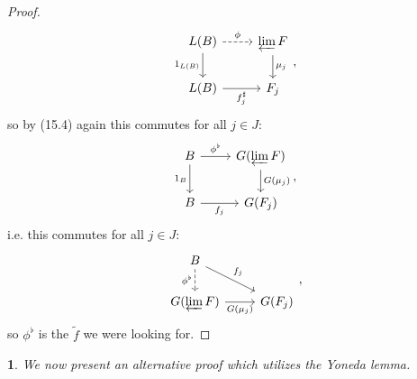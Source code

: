 \documentclass[12pt]{article}
\newtheorem{para}[theorem]{}
\begin{document}
\begin{proof}
	\begin{equation*}
\begin{tikzcd}
L(B) \arrow[r, "\phi", dashed] \arrow[d, "1_{L(B)}"'] & \varprojlim F \arrow[d, "\mu_j"] \\
L(B) \arrow[r, "f_j^\sharp"']                         & F_j                             
\end{tikzcd},
	\end{equation*}
	so by (15.4) again this commutes for all $j\in J$:
	\begin{equation*}
\begin{tikzcd}
B \arrow[r, "\phi^\flat"] \arrow[d, "1_B"'] & G(\varprojlim F) \arrow[d, "G(\mu_j)"] \\
B \arrow[r, "f_j"']                         & G(F_j)                                
\end{tikzcd},
	\end{equation*}
	i.e. this commutes for all $j\in J$:
	\begin{equation*}
\begin{tikzcd}
B \arrow[d, "\phi^\flat"', dashed] \arrow[rd, "f_j"] &        \\
G(\varprojlim F) \arrow[r, "G(\mu_j)"']              & G(F_j)
\end{tikzcd},
	\end{equation*}
	so $\phi^\flat$ is the $\tilde{f}$ we were looking for.
\end{proof}

\begin{para}
	We now present an alternative proof which utilizes the Yoneda lemma.
\end{para}
\end{document}

